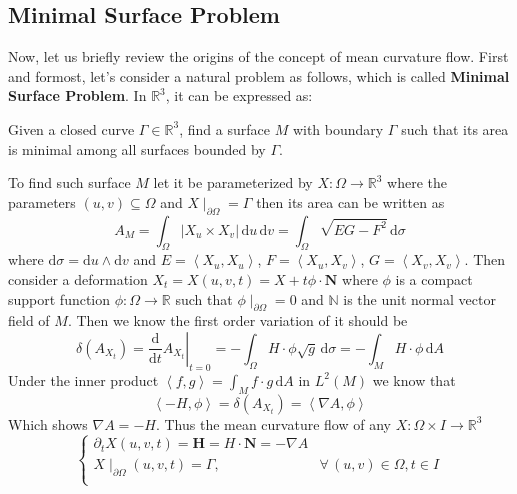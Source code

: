 \subsection{Minimal Surface Problem}
Now, let us briefly review the origins of the concept of mean curvature flow. First and formost, let's consider a natural problem as follows, which is called \textbf{Minimal Surface Problem}. In $\mathbb{R}^3$, it can be expressed as:
\begin{problem}[Plateau]\label{prob:Plateau}
    Given a closed curve $\Gamma\in\mathbb{R}^3$, find a surface $M$ with boundary $\Gamma$ such that its area is minimal among all surfaces bounded by $\Gamma$. 
\end{problem}

To find such surface $M$ let it be parameterized by $X:\Omega\to\mathbb{R}^3$ where the parameters $(u,v)\subseteq\Omega$ and $X\mid_{\partial\Omega}=\Gamma$ then its area can be written as
\begin{equation*}
    A_M=\int_\Omega\left|X_u\times X_v\right|\,\mathrm{d}u\,\mathrm{d}v=\int_{\Omega}\sqrt{EG-F^2}\, \mathrm{d}\sigma
\end{equation*}
where $\mathrm{d}\sigma=\mathrm{d}u\wedge\mathrm{d}v$ and $E=\left<X_{u},X_u\right>$, $F=\left<X_u,X_v\right>$, $G=\left<X_v,X_v\right>$. Then consider a deformation $X_t=X(u,v,t)=X+t\phi\cdot\mathbf{N}$ where $\phi$ is a compact support function $\phi:\Omega\to\mathbb{R}$ such that $\phi\mid_{\partial\Omega}=0$ and $\mathbb{N}$ is the unit normal vector field of $M$. Then we know the first order variation of it should be
\begin{equation*}
    \delta(A_{X_t})={\left.\frac{\mathrm{d}}{\mathrm{d}t}A_{X_t}\right|}_{t=0}=-\int_{\Omega}H\cdot\phi\sqrt{g}\,\mathrm{d}\sigma=-\int_M H\cdot\phi\,\mathrm{d}A
\end{equation*}
Under the inner product $\left<f,g\right>=\int_{M}f\cdot g\,\mathrm{d}A$ in $L^2(M)$ we know that
\begin{equation*}
    \left<-H,\phi\right>=\delta\left(A_{X_t}\right)=\left<\nabla A,\phi\right>
\end{equation*}
Which shows $\nabla A=-H$. Thus the mean curvature flow of any $X:\Omega\times I\to\mathbb{R}^3$
\begin{equation*}
    \begin{cases}
        \partial_t X(u,v,t)=\boldsymbol{H}=H\cdot\mathbf{N}=-\nabla A\\
        X\mid_{\partial\Omega}(u,v,t)=\Gamma, &\forall\, (u,v)\in\Omega, t\in I\\
    \end{cases}
\end{equation*}
